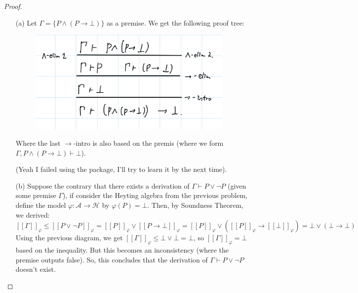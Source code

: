 \documentclass{article}
\begin{document}
\begin{proof}
    
    \hfil

    \begin{itemize}
        \item[(a)] Let $\Gamma=\{P\wedge (P\rightarrow \bot)\}$ as a premise. We get the following proof tree:
        \begin{figure}[h!]
            \centering
            \includegraphics[width=100mm]{2a_proof.jpg}
        \end{figure}

        Where the last $\rightarrow$-intro is also based on the premis (where we form $\Gamma, P\wedge (P\rightarrow \bot)\vdash \bot$).

        (Yeah I failed using the package, I'll try to learn it by the next time).
        \item[(b)] Suppose the contrary that there exists a derivation of $\Gamma\vdash P\vee \neg P$ (given some premise $\Gamma$), if consider the Heyting algebra from the previous problem, define the model $\varphi:\mathcal{A}\rightarrow \mathcal{H}$ by $\varphi(P)=\bot$.  Then, by Soundness Theorem, we derived: 
        $$[\![\Gamma]\!]_\varphi\leq [\![P\vee \neg P]\!]_\varphi = [\![P]\!]_\varphi \vee [\![P\rightarrow\bot]\!]_\varphi = [\![P]\!]_\varphi \vee \left([\![P]\!]_\varphi\rightarrow[\![\bot]\!]_\varphi\right) = \bot \vee (\bot \rightarrow \bot)$$
        Using the previous diagram, we get $[\![\Gamma]\!]_\varphi \leq \bot \vee \bot = \bot$, so $[\![\Gamma]\!]_\varphi = \bot$ based on the inequality. But this becomes an inconsistency (where the premise outputs false). So, this concludes that the derivation of $\Gamma\vdash P\vee \neg P$ doesn't exist.
    \end{itemize}
\end{proof}
\end{document}
